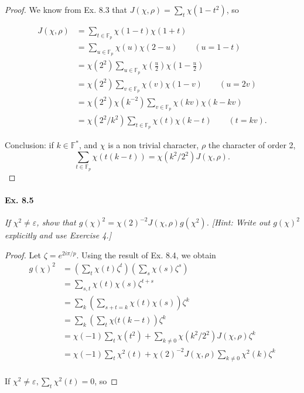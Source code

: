 \documentclass[11pt,a4paper]{article}
\newcommand{\F}{\mathbb{F}}
\begin{document}
{{}

\begin{proof}
We know from Ex. 8.3 that  $J(\chi,\rho) = \sum_t \chi(1-t^2)$, so

\begin{align*}
J(\chi,\rho) &= \sum_{t \in \F_p}\chi(1-t)\chi(1+t)\\
&=\sum_{u \in \F_p} \chi(u) \chi(2-u)\qquad(u = 1-t)\\
&=\chi(2^2) \sum_{u \in \F_p} \chi\left(\frac{u}{2}\right) \chi\left(1-\frac{u}{2}\right)\\
&= \chi(2^2) \sum_{v \in \F_p} \chi(v) \chi(1-v)\qquad(u = 2v)\\
&= \chi(2^2) \chi(k^{-2}) \sum_{v \in \F_p} \chi(kv) \chi(k-kv)\\
&=\chi(2^2/k^2) \sum_{t \in \F_p} \chi(t) \chi(k-t)\qquad(t=kv).
\end{align*}

Conclusion: if $k \in \mathbb{F}^*$, and $\chi$ is a non trivial character, $\rho$ the character of order 2,
$$ \sum_{t\in \F_p}\chi(t(k-t)) = \chi(k^2/2^2) J(\chi,\rho).$$
\end{proof}

\paragraph{Ex. 8.5}

{\it If $\chi^2 \ne \varepsilon$, show that $g(\chi)^2 = \chi(2)^{-2}J(\chi,\rho)g(\chi^2)$. [Hint: Write out $g(\chi)^2$ explicitly and use Exercise 4.]

}

\begin{proof}
Let  $\zeta = e^{2i\pi/p}$.
Using the result of Ex. 8.4, we obtain
\begin{align*}
g(\chi)^2 &= \left(\sum_t \chi(t) \zeta^t \right)\left(\sum_s \chi(s) \zeta^s\right)\\
&=\sum_{s,t} \chi(t)\chi(s) \zeta^{t+s}\\
&=\sum_k\left(\sum_{s+t=k} \chi(t) \chi(s)\right)\zeta^k\\
&=\sum_k\left( \sum_t \chi(t(k-t) \right) \zeta^k\\
&= \chi(-1)\sum_t \chi(t^2) + \sum_{k\neq0} \chi(k^2/2^2) J(\chi,\rho) \zeta^k\\
&= \chi(-1)\sum_t \chi^2(t) + \chi(2)^{-2}  J(\chi,\rho) \sum_{k\neq0} \chi^2(k)  \zeta^k\\
\end{align*}

If $\chi^2 \neq \varepsilon, \sum_t \chi^2(t)=0$, so


\end{proof}}
\end{document}
